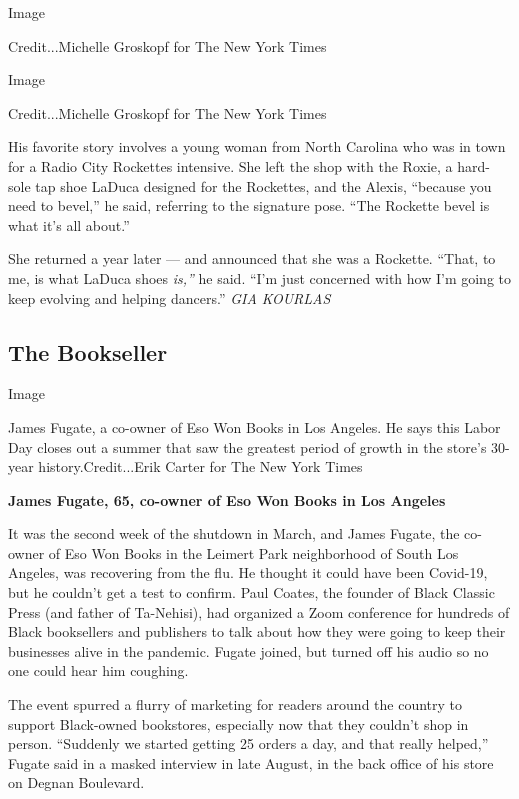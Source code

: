 Image

Credit...Michelle Groskopf for The New York Times

Image

Credit...Michelle Groskopf for The New York Times

His favorite story involves a young woman from North Carolina who was in
town for a Radio City Rockettes intensive. She left the shop with the
Roxie, a hard-sole tap shoe LaDuca designed for the Rockettes, and the
Alexis, ``because you need to bevel,'' he said, referring to the
signature pose. ``The Rockette bevel is what it's all about.''

She returned a year later --- and announced that she was a Rockette.
``That, to me, is what LaDuca shoes \emph{is,''} he said. ``I'm just
concerned with how I'm going to keep evolving and helping dancers.''
\emph{GIA KOURLAS}

\hypertarget{the-bookseller}{%
\subsection{The Bookseller}\label{the-bookseller}}

Image

James Fugate, a co-owner of Eso Won Books in Los Angeles. He says this
Labor Day closes out a summer that saw the greatest period of growth in
the store's 30-year history.Credit...Erik Carter for The New York Times

\textbf{James Fugate, 65, co-owner of Eso Won Books in Los Angeles}

It was the second week of the shutdown in March, and James Fugate, the
co-owner of Eso Won Books in the Leimert Park neighborhood of South Los
Angeles, was recovering from the flu. He thought it could have been
Covid-19, but he couldn't get a test to confirm. Paul Coates, the
founder of Black Classic Press (and father of Ta-Nehisi), had organized
a Zoom conference for hundreds of Black booksellers and publishers to
talk about how they were going to keep their businesses alive in the
pandemic. Fugate joined, but turned off his audio so no one could hear
him coughing.

The event spurred a flurry of marketing for readers around the country
to support Black-owned bookstores, especially now that they couldn't
shop in person. ``Suddenly we started getting 25 orders a day, and that
really helped,'' Fugate said in a masked interview in late August, in
the back office of his store on Degnan Boulevard.


